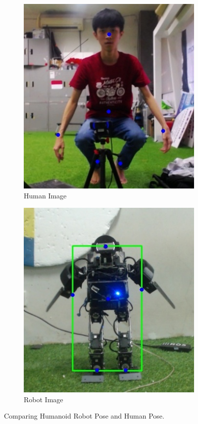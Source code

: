 \begin{figure}
  \centering
  \begin{subfigure}[b]{0.4\textwidth}
      \centering
      \includegraphics[width=\textwidth]{gambar/human_6_result.jpg}
      \caption{Human Image}
      \label{fig:humanimageb}
  \end{subfigure}
  \hfill
  \begin{subfigure}[b]{0.4\textwidth}
      \centering
      \includegraphics[width=\textwidth]{gambar/robot_6_result.jpg}
      \caption{Robot Image}
      \label{fig:robotimageb}
  \end{subfigure}
     \caption{Comparing Humanoid Robot Pose and Human Pose.}
     \label{fig:comparingb}
\end{figure}